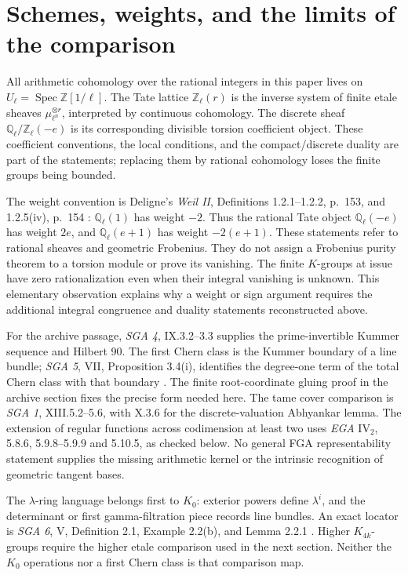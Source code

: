 \documentclass[11pt,a4paper]{article}
\theoremstyle{definition}
\begin{document}
\section{Schemes, weights, and the limits of the comparison}
\label{sec:framework}

All arithmetic cohomology over the rational integers in this paper lives on
$U_\ell=\operatorname{Spec}\mathbb Z[1/\ell]$. The Tate lattice
$\mathbb Z_\ell(r)$ is the inverse system of finite etale sheaves
$\mu_{\ell^n}^{\otimes r}$, interpreted by continuous cohomology.
The discrete sheaf $\mathbb Q_\ell/\mathbb Z_\ell(-e)$ is its corresponding
divisible torsion coefficient object. These coefficient conventions,
the local conditions, and the compact/discrete duality are part of the
statements; replacing them by rational cohomology loses the finite groups
being bounded.

The weight convention is Deligne's \emph{Weil II}, Definitions 1.2.1--1.2.2,
p.~153, and 1.2.5(iv), p.~154 \cite{DeligneWeilII}: $\mathbb Q_\ell(1)$ has weight $-2$.
Thus the rational Tate object $\mathbb Q_\ell(-e)$ has weight $2e$,
and $\mathbb Q_\ell(e+1)$ has weight $-2(e+1)$. These statements refer
to rational sheaves and geometric Frobenius. They do not assign a
Frobenius purity theorem to a torsion module or prove its vanishing.
The finite $K$-groups at issue have zero rationalization even when their
integral vanishing is unknown. This elementary observation explains why
a weight or sign argument requires the additional integral congruence
and duality statements reconstructed above.

For the archive passage, \emph{SGA 4}, IX.3.2--3.3 supplies the
prime-invertible Kummer sequence and Hilbert 90. The first Chern class
is the Kummer boundary of a line bundle; \emph{SGA 5}, VII,
Proposition 3.4(i), identifies the degree-one term of the total Chern
class with that boundary \cite{SGA5}. The finite root-coordinate gluing proof in
the archive section fixes the precise form needed here. The tame
cover comparison is \emph{SGA 1}, XIII.5.2--5.6, with X.3.6 for the
discrete-valuation Abhyankar lemma. The extension of regular functions
across codimension at least two uses \emph{EGA} $\mathrm{IV}_2$,
5.8.6, 5.9.8--5.9.9 and 5.10.5, as checked below. No general FGA
representability statement supplies the missing arithmetic kernel
or the intrinsic recognition of geometric tangent bases.

The $\lambda$-ring language belongs first to $K_0$: exterior powers
define $\lambda^i$, and the determinant or first gamma-filtration
piece records line bundles. An exact locator is \emph{SGA 6}, V,
Definition 2.1, Example 2.2(b), and Lemma 2.2.1 \cite{SGA6}. Higher $K_{4k}$-groups
require the higher etale comparison used in the next section. Neither
the $K_0$ operations nor a first Chern class is that comparison map.
\end{document}

